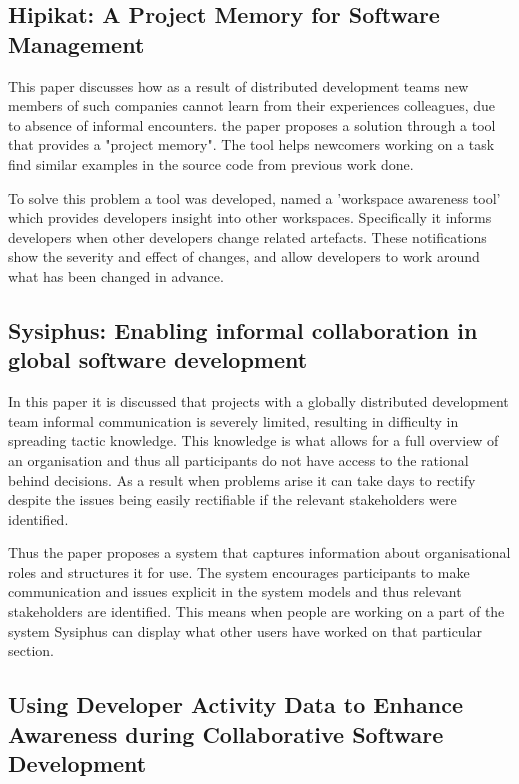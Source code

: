 \documentclass{l4proj}
\begin{document}
\subsection {Hipikat: A Project Memory for Software Management}

This paper discusses how as a result of distributed development teams new members of such companies cannot learn from their experiences colleagues, due to absence of informal encounters.
 the paper proposes a solution through a tool that provides a "project memory".  The tool helps newcomers working on a task find similar examples in the source code from previous work done. 

To solve this problem a tool was developed, named a 'workspace awareness tool' which provides developers insight into other workspaces.  Specifically it informs developers when other developers change related artefacts.  These notifications show the severity and effect of changes, and allow developers to work around what has been changed in advance.

\subsection {Sysiphus: Enabling informal collaboration in global software development}

In this paper it is discussed that projects with a globally distributed development team informal communication is severely limited, resulting in difficulty in spreading tactic knowledge.  This knowledge is what allows for a full overview of an organisation and thus all participants do not have access to the rational behind decisions.  As a result when problems arise it can take days to rectify despite the issues being easily rectifiable if the relevant stakeholders were identified.

Thus the paper proposes a system that captures information about organisational roles and structures it for use.  The system encourages participants to make communication and issues explicit in the system models and thus relevant stakeholders are identified.  This means when people are working on a part of the system Sysiphus can display what other users have worked on that particular section.

\subsection {Using Developer Activity Data to Enhance Awareness during Collaborative Software Development}
\end{document}
